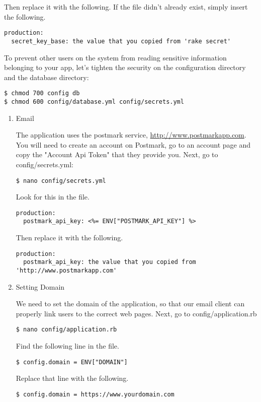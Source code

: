 \documentclass[11pt]{article}
\begin{document}
Then replace it with the following. If the file didn't already exist, simply insert the following.

\begin{verbatim}
production:
  secret_key_base: the value that you copied from 'rake secret'
\end{verbatim}

To prevent other users on the system from reading sensitive information belonging to your app, let's tighten the security on the configuration directory and the database directory:
\begin{verbatim}
$ chmod 700 config db
$ chmod 600 config/database.yml config/secrets.yml
\end{verbatim}

\begin{enumerate}
\item Email
\label{sec:orgc91f5bf}

The application uses the postmark service, \url{http://www.postmarkapp.com}. You will need to create an account on Postmark, go to an account page and copy the "Account Api Token" that they provide you.
Next, go to config/secrets.yml:

\begin{verbatim}
$ nano config/secrets.yml
\end{verbatim}

Look for this in the file.

\begin{verbatim}
production:
  postmark_api_key: <%= ENV["POSTMARK_API_KEY"] %>
\end{verbatim}

Then replace it with the following.

\begin{verbatim}
production:
  postmark_api_key: the value that you copied from 'http://www.postmarkapp.com'
\end{verbatim}


\item Setting Domain
\label{sec:org1abefda}

We need to set the domain of the application, so that our email client can properly link users to the correct web pages.
Next, go to config/application.rb
\begin{verbatim}
$ nano config/application.rb
\end{verbatim}

Find the following line in the file.

\begin{verbatim}
$ config.domain = ENV["DOMAIN"]
\end{verbatim}

Replace that line with the following.

\begin{verbatim}
$ config.domain = https://www.yourdomain.com
\end{verbatim}
\end{enumerate}
\end{document}
